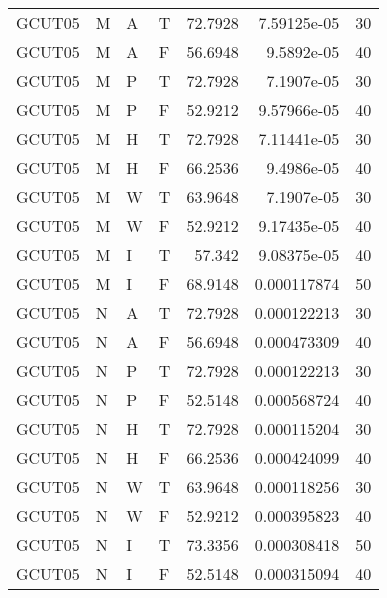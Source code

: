 \begin{tabular}{llllrrr}
    GCUT05   & M     & A     & T          & 72.7928    & 7.59125e-05 & 30       \\
    GCUT05   & M     & A     & F          & 56.6948    & 9.5892e-05  & 40       \\
    GCUT05   & M     & P     & T          & 72.7928    & 7.1907e-05  & 30       \\
    GCUT05   & M     & P     & F          & 52.9212    & 9.57966e-05 & 40       \\
    GCUT05   & M     & H     & T          & 72.7928    & 7.11441e-05 & 30       \\
    GCUT05   & M     & H     & F          & 66.2536    & 9.4986e-05  & 40       \\
    GCUT05   & M     & W     & T          & 63.9648    & 7.1907e-05  & 30       \\
    GCUT05   & M     & W     & F          & 52.9212    & 9.17435e-05 & 40       \\
    GCUT05   & M     & I     & T          & 57.342     & 9.08375e-05 & 40       \\
    GCUT05   & M     & I     & F          & 68.9148    & 0.000117874 & 50       \\
    GCUT05   & N     & A     & T          & 72.7928    & 0.000122213 & 30       \\
    GCUT05   & N     & A     & F          & 56.6948    & 0.000473309 & 40       \\
    GCUT05   & N     & P     & T          & 72.7928    & 0.000122213 & 30       \\
    GCUT05   & N     & P     & F          & 52.5148    & 0.000568724 & 40       \\
    GCUT05   & N     & H     & T          & 72.7928    & 0.000115204 & 30       \\
    GCUT05   & N     & H     & F          & 66.2536    & 0.000424099 & 40       \\
    GCUT05   & N     & W     & T          & 63.9648    & 0.000118256 & 30       \\
    GCUT05   & N     & W     & F          & 52.9212    & 0.000395823 & 40       \\
    GCUT05   & N     & I     & T          & 73.3356    & 0.000308418 & 50       \\
    GCUT05   & N     & I     & F          & 52.5148    & 0.000315094 & 40       \\
    \hline
\end{tabular}